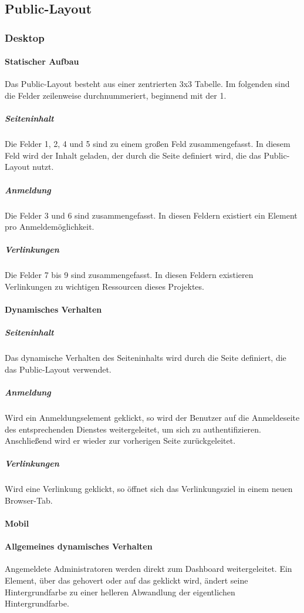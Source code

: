 \subsection{Public-Layout}

\subsubsection{Desktop}
\paragraph*{Statischer Aufbau}
Das Public-Layout besteht aus einer zentrierten 3x3 Tabelle.
Im folgenden sind die Felder zeilenweise durchnummeriert, beginnend mit der 1.

\subparagraph*{Seiteninhalt}
Die Felder 1, 2, 4 und 5 sind zu einem großen Feld zusammengefasst. In diesem Feld wird der Inhalt geladen,
der durch die Seite definiert wird, die das Public-Layout nutzt.

\subparagraph*{Anmeldung}
Die Felder 3 und 6 sind zusammengefasst. In diesen Feldern existiert ein Element pro Anmeldemöglichkeit.

\subparagraph*{Verlinkungen}
Die Felder 7 bis 9 sind zusammengefasst. In diesen Feldern existieren Verlinkungen zu wichtigen Ressourcen dieses Projektes.

\paragraph*{Dynamisches Verhalten}
\subparagraph*{Seiteninhalt}
Das dynamische Verhalten des Seiteninhalts wird durch die Seite definiert, die das Public-Layout verwendet.

\subparagraph*{Anmeldung}
Wird ein Anmeldungselement geklickt, so wird der Benutzer auf die Anmeldeseite des entsprechenden Dienstes weitergeleitet, um sich zu authentifizieren.
Anschließend wird er wieder zur vorherigen Seite zurückgeleitet.

\subparagraph*{Verlinkungen}
Wird eine Verlinkung geklickt, so öffnet sich das Verlinkungsziel in einem neuen Browser-Tab.

\paragraph*{Mobil}

\paragraph*{Allgemeines dynamisches Verhalten}
Angemeldete Administratoren werden direkt zum Dashboard weitergeleitet.
Ein Element, über das gehovert oder auf das geklickt wird, ändert seine Hintergrundfarbe zu einer helleren Abwandlung der eigentlichen Hintergrundfarbe.

